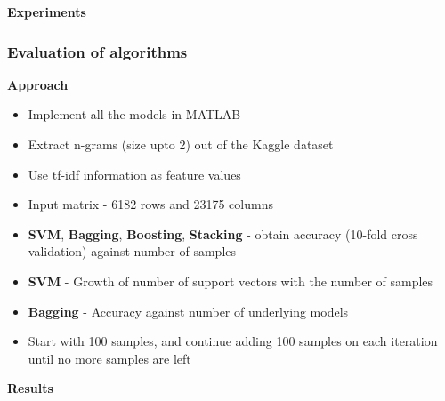 \documentclass{beamer}
\begin{document}
    \begin{frame}
        \begin{center}
            \textbf{Experiments}
        \end{center}
    \end{frame}
    
    \begin{frame}
        \frametitle{Evaluation of algorithms}
        \begin{center}
            \textbf{Approach}
        \end{center}
        \begin{itemize}
            \item{Implement all the models in MATLAB}
            \item{Extract n-grams (size upto 2) out of the Kaggle dataset}
            \item{Use tf-idf information as feature values}
            \item{Input matrix - 6182 rows and 23175 columns}
            \item{\textbf{SVM}, \textbf{Bagging}, \textbf{Boosting}, \textbf{Stacking} - obtain accuracy (10-fold cross validation) against number of samples}
            \item{\textbf{SVM} - Growth of number of support vectors with the number of samples}
            \item{\textbf{Bagging} - Accuracy against number of underlying models}
            \item{Start with 100 samples, and continue adding 100 samples on each iteration until no more samples are left}
        \end{itemize}
    \end{frame}
    
    \begin{frame}
        \begin{center}
            \textbf{Results}
        \end{center}
    \end{frame}
    
\end{document}
